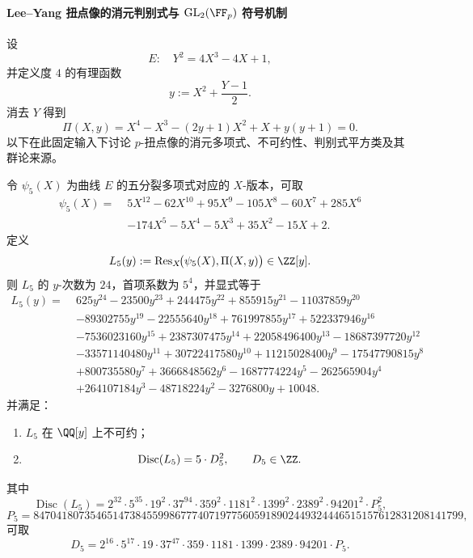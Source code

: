 \paragraph{Lee--Yang 扭点像的消元判别式与 \texorpdfstring{$\mathrm{GL}_2(\FF_p)$}{GL2(Fp)} 符号机制}
设
\[
E:\quad Y^2=4X^3-4X+1,
\]
并定义度 \(4\) 的有理函数
\[
y:=X^2+\frac{Y-1}{2}.
\]
消去 \(Y\) 得到
\[
\Pi(X,y)=X^4-X^3-(2y+1)X^2+X+y(y+1)=0.
\]
以下在此固定输入下讨论 \(p\)-扭点像的消元多项式、不可约性、判别式平方类及其群论来源。

\begin{theorem}\label{thm:xi-leyang-image-five-torsion-elimination-irreducibility-discriminant}
令 \(\psi_5(X)\) 为曲线 \(E\) 的五分裂多项式对应的 \(X\)-版本，可取
\[
\begin{aligned}
\psi_5(X)=\;&5X^{12}-62X^{10}+95X^9-105X^8-60X^7+285X^6\\
&-174X^5-5X^4-5X^3+35X^2-15X+2.
\end{aligned}
\]
定义
\[
L_5(y):=\operatorname{Res}_X\!\bigl(\psi_5(X),\Pi(X,y)\bigr)\in\ZZ[y].
\]
则 \(L_5\) 的 \(y\)-次数为 \(24\)，首项系数为 \(5^4\)，并显式等于
\[
\begin{aligned}
L_5(y)=\;&625y^{24}-23500y^{23}+244475y^{22}+855915y^{21}-11037859y^{20}\\
&-89302755y^{19}-22555640y^{18}+761997855y^{17}+522337946y^{16}\\
&-7536023160y^{15}+2387307475y^{14}+22058496400y^{13}-18687397720y^{12}\\
&-33571140480y^{11}+30722417580y^{10}+11215028400y^9-17547790815y^8\\
&+800735580y^7+3666848562y^6-1687774224y^5-262565904y^4\\
&+264107184y^3-48718224y^2-3276800y+10048.
\end{aligned}
\]
并满足：
\begin{enumerate}
  \item \(L_5\) 在 \(\QQ[y]\) 上不可约；
  \item
  \[
  \operatorname{Disc}(L_5)=5\cdot D_5^2,\qquad D_5\in\ZZ.
  \]
\end{enumerate}
其中
\[
\operatorname{Disc}(L_5)
=
2^{32}\cdot 5^{35}\cdot 19^2\cdot 37^{94}\cdot 359^2\cdot 1181^2\cdot 1399^2\cdot 2389^2\cdot 94201^2\cdot P_5^2,
\]
\[
P_5=
8470418073546514738455998677740719775605918902449324446515157612831208141799,
\]
可取
\[
D_5=
2^{16}\cdot 5^{17}\cdot 19\cdot 37^{47}\cdot 359\cdot 1181\cdot 1399\cdot 2389\cdot 94201\cdot P_5.
\]
\end{theorem}
